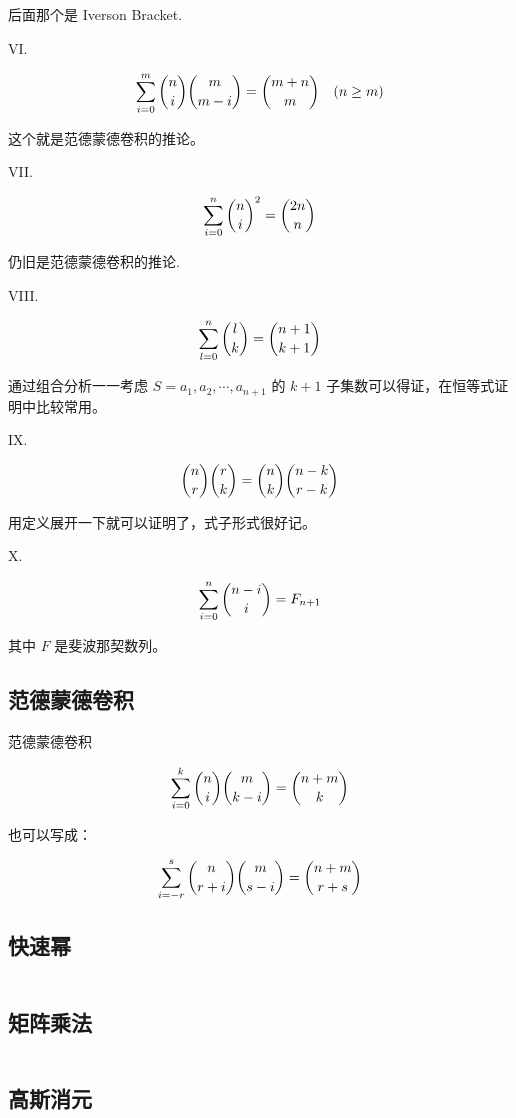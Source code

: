 \documentclass[titlepage, a4paper]{article}
\begin{document}
\begin{multicols}{2}
\begin{spacing}{0.6}
				 	后面那个是 Iverson Bracket.
				 	
				 	VI.
				 	
				 	$$
				 	\sum_{i=0}^m \dbinom{n}{i}\dbinom{m}{m-i} = \dbinom{m+n}{m}\ \ \ (n \geq m)
				 	$$
				 	
				 	这个就是范德蒙德卷积的推论。
				 	
				 	VII.
				 	
				 	$$
				 	\sum_{i=0}^n\dbinom{n}{i}^2=\dbinom{2n}{n}
				 	$$
				 	
				 	仍旧是范德蒙德卷积的推论.
				 	
				 	VIII.
				 	
				 	$$
				 	\sum_{l=0}^n\dbinom{l}{k} = \dbinom{n+1}{k+1}
				 	$$
				 	
				 	通过组合分析一一考虑 $S={a_1, a_2, \cdots, a_{n+1}}$ 的 $k+1$ 子集数可以得证，在恒等式证明中比较常用。
				 	
				 	IX.
				 	
				 	$$
				 	\dbinom{n}{r}\dbinom{r}{k} = \dbinom{n}{k}\dbinom{n-k}{r-k}
				 	$$
				 	
				 	用定义展开一下就可以证明了，式子形式很好记。
				 	
				 	X.
				 	
				 	$$
				 	\sum_{i=0}^n\dbinom{n-i}{i}=F_{n+1}
				 	$$
				 	
				 	其中 $F$ 是斐波那契数列。
			 	\subsection{范德蒙德卷积}
				 	范德蒙德卷积
				 	
				 	$$
				 	\sum\limits_{i = 0}^k \dbinom{n}{i}\dbinom{m}{k - i} = \dbinom{n + m}{k}
				 	$$
				 	
				 	也可以写成：
				 	
				 	$$
				 	\sum\limits_{i = -r}^s \dbinom{n}{r + i} \dbinom{m}{s - i} = \dbinom{n + m}{r + s}
				 	$$
			 	\subsection{快速幂}
			 		\inputminted{cpp}{src/Math/Qpow.cpp}
			 	\subsection{矩阵乘法}
			 		\inputminted{cpp}{src/Math/Matrix_mul.cpp}
			 	\subsection{高斯消元}
			 		\inputminted{cpp}{src/Math/Gauss_cut.cpp}

\end{spacing}
\end{multicols}
\end{document}
